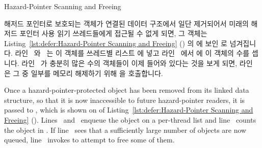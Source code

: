 \begin{listing}[tbp]

\caption{Hazard-Pointer Scanning and Freeing}
\label{lst:defer:Hazard-Pointer Scanning and Freeing}
\end{listing}

\begin{fcvref}
해저드 포인터로 보호되는 객체가 연결된 데이터 구조에서 일단 제거되어서 미래의
해저드 포인터 사용 읽기 쓰레드들에게 접근될 수 없게 되면, 그 객체는
Listing~\ref{lst:defer:Hazard-Pointer Scanning and Freeing}
() 의  에 보인  로
넘겨집니다.
라인~ 와~ 는 이 객체를 쓰레드별 리스트  에
넣고 라인~ 에서  에 이 객체의 수를 셉니다.
라인~ 가 충분히 많은 수의 객체들이 이제 들어와 있다는 것을 보게
되면, 라인~ 은 그 중 일부를 메모리 해제하기 위해 
을 호출합니다.
\end{fcvref}

\iffalse

\begin{fcvref}
Once a hazard-pointer-protected object has been removed from its
linked data structure, so that it is now inaccessible to future
hazard-pointer readers, it is passed to ,
which is shown on  of
Listing~\ref{lst:defer:Hazard-Pointer Scanning and Freeing}
().
Lines~ and~
enqueue the object on a per-thread list 
and line~ counts the object in .
If line~ sees that a sufficiently large number of objects are now
queued, line~ invokes  to attempt to
free some of them.
\end{fcvref}


